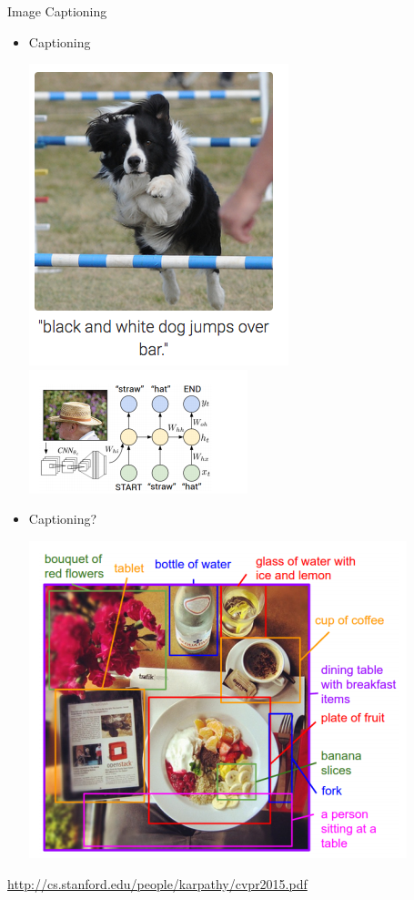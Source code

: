 \documentclass{beamer}
\begin{document}
\begin{frame}{Image Captioning}
	
	\begin{itemize}
		  \item Captioning
		
		\begin{center}
			  \includegraphics[scale=0.25]{img/ic2}  ~~~~\includegraphics[scale=0.7]{img/ic3}
		\end{center}
		
		  \item Captioning?
			\begin{center}
				  \includegraphics[scale=0.2]{img/icc}
			\end{center}
	\end{itemize}
	  \href{http://cs.stanford.edu/people/karpathy/cvpr2015.pdf}{http://cs.stanford.edu/people/karpathy/cvpr2015.pdf}
\end{frame}
\end{document}

